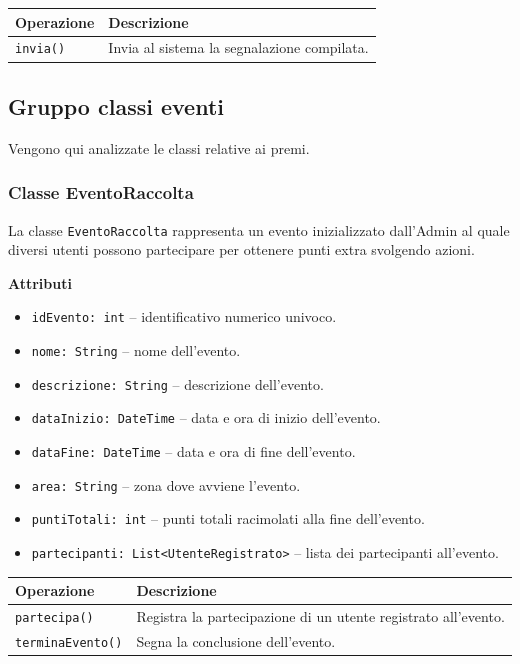 \documentclass[12pt,a4paper]{article}
\begin{document}
\begin{table}[H]
\centering
\begin{tabularx}{\textwidth}{@{}lX@{}}
\toprule
\textbf{Operazione} & \textbf{Descrizione} \\ \midrule
\texttt{invia()} & Invia al sistema la segnalazione compilata. \\
\bottomrule
\end{tabularx}
\end{table}

\subsection{Gruppo classi eventi} 
Vengono qui analizzate le classi relative ai premi.

\subsubsection{Classe EventoRaccolta}
La classe \texttt{EventoRaccolta} rappresenta un evento inizializzato dall'Admin al quale diversi utenti 
possono partecipare per ottenere punti extra svolgendo azioni.

\textbf{Attributi}
\begin{itemize}
    \item \texttt{idEvento: int} -- identificativo numerico univoco.
    \item \texttt{nome: String} -- nome dell'evento.
    \item \texttt{descrizione: String} -- descrizione dell'evento.
    \item \texttt{dataInizio: DateTime} -- data e ora di inizio dell'evento.
    \item \texttt{dataFine: DateTime} -- data e ora di fine dell'evento.
    \item \texttt{area: String} -- zona dove avviene l'evento.
    \item \texttt{puntiTotali: int} -- punti totali racimolati alla fine dell'evento.
    \item \texttt{partecipanti: List<\texttt{UtenteRegistrato}>} -- lista dei partecipanti all'evento.
\end{itemize}

\begin{table}[H]
\centering
\begin{tabularx}{\textwidth}{@{}lX@{}}
\toprule
\textbf{Operazione} & \textbf{Descrizione} \\ \midrule
\texttt{partecipa()} & Registra la partecipazione di un utente registrato all'evento. \\
\texttt{terminaEvento()} & Segna la conclusione dell'evento. \\
\bottomrule
\end{tabularx}
\end{table}
\end{document}
